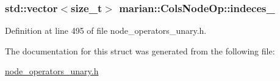 \subsubsection[{\texorpdfstring{indeces\+\_\+}{indeces_}}]{\setlength{\rightskip}{0pt plus 5cm}std\+::vector$<$size\+\_\+t$>$ marian\+::\+Cols\+Node\+Op\+::indeces\+\_\+}\hypertarget{structmarian_1_1ColsNodeOp_a9c99c0784351045f1d0e61dbf922ea72}{}\label{structmarian_1_1ColsNodeOp_a9c99c0784351045f1d0e61dbf922ea72}


Definition at line 495 of file node\+\_\+operators\+\_\+unary.\+h.



The documentation for this struct was generated from the following file\+:\begin{DoxyCompactItemize}
\item 
\hyperlink{node__operators__unary_8h}{node\+\_\+operators\+\_\+unary.\+h}\end{DoxyCompactItemize}
